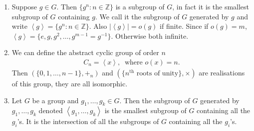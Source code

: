 \begin{remark} \mbox{}
\begin{enumerate}
\def\labelenumi{\roman{enumi}.}
\item
  Suppose \(g \in G\). Then \(\{ g^n : n \in \mathbb{Z} \}\) is a subgroup of \(G\), in fact it is the smallest subgroup of \(G\) containing \(g\).
  We call it the subgroup of \(G\) generated by \(g\) and write \(\left\langle g \right\rangle = \{ g^n : n \in \mathbb{Z} \}\). Also \(|\left\langle g \right\rangle| = o(g)\) if finite.
  Since if \(o(g) = m\), \(\left\langle g \right\rangle = \{ e, g, g^2, \ldots, g^{m-1} = g^{-1 }\}\).
  Otherwise both infinite.
\item
  We can define the abstract cyclic group of order \(n\)
  \begin{align*}
  C_n = \left\langle x \right\rangle,\ \text{ where } o(x) = n.
  \end{align*}
  Then \(( \{ 0, 1, \ldots, n-1 \}, +_n)\) and \(( \{ n^{\text{th}} \text{ roots of unity}\}, \times)\) are realisations of this group, they are all isomorphic.
\item
  Let \(G\) be a group and \(g_1, \ldots, g_k \in G\). Then the subgroup of \(G\) generated by \(g_1, \ldots, g_k\) denoted \(\left\langle g_1, \ldots, g_k \right\rangle\) is the smallest subgroup of \(G\) containing all the \(g_i\)'s. It is the intersection of all the subgroups of \(G\) containing all the \(g_i\)'s.
\end{enumerate}

\end{remark}